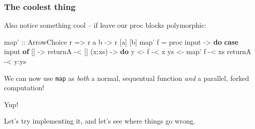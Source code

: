 \documentclass[]{article}
\newenvironment{Shaded}{}{}
\newcommand{\KeywordTok}[1]{\textcolor[rgb]{0.00,0.44,0.13}{\textbf{{#1}}}}
\newcommand{\DataTypeTok}[1]{\textcolor[rgb]{0.56,0.13,0.00}{{#1}}}
\newcommand{\DecValTok}[1]{\textcolor[rgb]{0.25,0.63,0.44}{{#1}}}
\newcommand{\OtherTok}[1]{\textcolor[rgb]{0.00,0.44,0.13}{{#1}}}
\newcommand{\FunctionTok}[1]{\textcolor[rgb]{0.02,0.16,0.49}{{#1}}}
\newcommand{\NormalTok}[1]{{#1}}
\begin{document}
\subsubsection{The coolest thing}\label{the-coolest-thing}

Also notice something cool -- if leave our proc blocks polymorphic:

\begin{Shaded}
\begin{Highlighting}[]
\OtherTok{map' ::} \DataTypeTok{ArrowChoice} \NormalTok{r }\OtherTok{=>} \NormalTok{r a b }\OtherTok{->} \NormalTok{r [a] [b]}
\NormalTok{map' f }\FunctionTok{=} \NormalTok{proc input }\OtherTok{->} \KeywordTok{do}
    \KeywordTok{case} \NormalTok{input }\KeywordTok{of}
      \NormalTok{[]     }\OtherTok{->}
          \NormalTok{returnA        }\FunctionTok{-<} \NormalTok{[]}
      \NormalTok{(x}\FunctionTok{:}\NormalTok{xs) }\OtherTok{->} \KeywordTok{do}
          \NormalTok{y  }\OtherTok{<-} \NormalTok{f        }\FunctionTok{-<} \NormalTok{x}
          \NormalTok{ys }\OtherTok{<-} \NormalTok{map' f   }\FunctionTok{-<} \NormalTok{xs}
          \NormalTok{returnA        }\FunctionTok{-<} \NormalTok{y}\FunctionTok{:}\NormalTok{ys}
\end{Highlighting}
\end{Shaded}

We can now use \texttt{map\textquotesingle{}} as \emph{both} a normal,
sequentual function \emph{and} a parallel, forked computation!

\begin{Shaded}
\end{Shaded}

Yup!

Let's try implementing it, and let's see where things go wrong.
\end{document}

